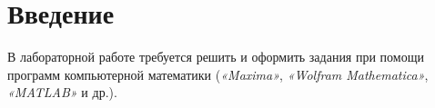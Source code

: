 \section{Введение}
В лабораторной работе требуется решить и оформить задания при помощи программ компьютерной математики (\textit{«Maxima»}, \textit{«Wolfram Mathematica»}, \textit{«MATLAB»} и др.).
